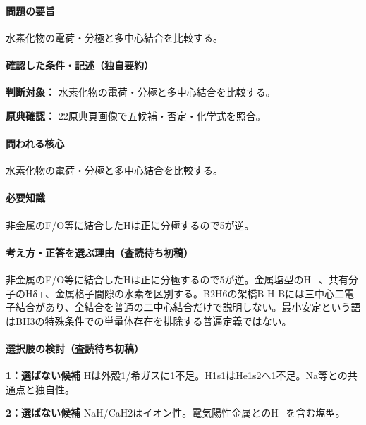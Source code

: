 \paragraph{問題の要旨} 水素化物の電荷・分極と多中心結合を比較する。

\paragraph{確認した条件・記述（独自要約）}\mbox{}\par

\noindent\textbf{判断対象：} 水素化物の電荷・分極と多中心結合を比較する。\par

\noindent\textbf{原典確認：} 22原典頁画像で五候補・否定・化学式を照合。\par

\paragraph{問われる核心} 水素化物の電荷・分極と多中心結合を比較する。

\paragraph{必要知識} 非金属のF/O等に結合したHは正に分極するので5が逆。

\paragraph{考え方・正答を選ぶ理由（査読待ち初稿）} 非金属のF/O等に結合したHは正に分極するので5が逆。金属塩型のH−、共有分子のHδ+、金属格子間隙の水素を区別する。B2H6の架橋B-H-Bには三中心二電子結合があり、全結合を普通の二中心結合だけで説明しない。最小安定という語はBH3の特殊条件での単量体存在を排除する普遍定義ではない。

\paragraph{選択肢の検討（査読待ち初稿）}\mbox{}\par

\noindent\textbf{1：選ばない候補} Hは外殻1/希ガスに1不足。H1s1はHe1s2へ1不足。Na等との共通点と独自性。\par

\noindent\textbf{2：選ばない候補} NaH/CaH2はイオン性。電気陽性金属とのH−を含む塩型。\par

